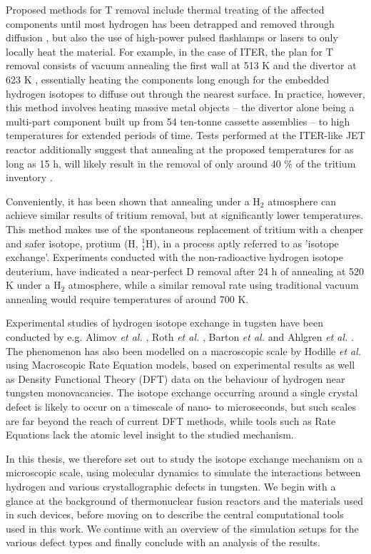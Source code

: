 Proposed methods for T removal include thermal treating of the affected components until most hydrogen has been detrapped and removed through diffusion \cite{heinola2017long}, but also the use of high-power pulsed flashlamps \cite{gibson2005removal} or lasers \cite{skinner2008recent,de2017efficiency} to only locally heat the material. 
For example, in the case of ITER, the plan for T removal consists of vacuum annealing the first wall at 513 K and the divertor at 623 K \cite{pitts2011physics}, essentially heating the components long enough for the embedded hydrogen isotopes to diffuse out through the nearest surface.
In practice, however, this method involves heating massive metal objects -- the divertor alone being a multi-part component built up from 54 ten-tonne cassette assemblies -- to high temperatures for extended periods of time. 
Tests performed at the ITER-like JET reactor additionally suggest that annealing at the proposed temperatures for as long as 15 h, will likely result in the removal of only around 40 \% of the tritium inventory \cite{heinola2017long}. 

Conveniently, it has been shown \cite{alimov2011hydrogen, roth2013hydrogen, barton2014deuterium} that annealing under a H$_2$ atmosphere can achieve similar results of tritium removal, but at significantly lower temperatures. 
This method makes use of the spontaneous replacement of tritium with a cheaper and safer isotope, protium (H, $^1_1$H), in a process aptly referred to as 'isotope exchange'. 
Experiments conducted with the non-radioactive hydrogen isotope deuterium, have indicated a near-perfect D removal after 24 h of annealing at 520 K under a H$_2$ atmosphere, while a similar removal rate using traditional vacuum annealing would require temperatures of around 700 K. \cite{ahlgren2019hydrogen}

Experimental studies of hydrogen isotope exchange in tugsten have been conducted by e.g. Alimov \textit{et al.} \cite{alimov2011hydrogen}, Roth \textit{et al.}  \cite{roth2013hydrogen}, Barton \textit{et al.} \cite{barton2014deuterium} and Ahlgren \textit{et al.} \cite{ahlgren2019hydrogen}. 
The phenomenon has also been modelled on a macroscopic scale by Hodille \textit{et al.} \cite{hodille2016study} using Macroscopic Rate Equation models, based on experimental results as well as Density Functional Theory (DFT) data on the behaviour of hydrogen near tungsten monovacancies. 
The isotope exchange occurring around a single crystal defect is likely to occur on a timescale of nano- to microseconds, but such scales are far beyond the reach of current DFT methods, while tools such as Rate Equations lack the atomic level insight to the studied mechanism.

In this thesis, we therefore set out to study the isotope exchange mechanism on a microscopic scale, using molecular dynamics to simulate the interactions between hydrogen and various crystallographic defects in tungsten.
We begin with a glance at the background of thermonuclear fusion reactors and the materials used in such devices, before moving on to describe the central computational tools used in this work. 
We continue with an overview of the simulation setups for the various defect types and finally conclude with an analysis of the results.

